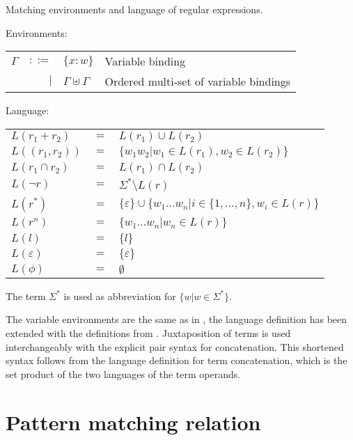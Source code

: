 \begin{defn}
   \label{defn-lang}
   Matching environments and language of regular expressions.

   Environments:

   \begin{tabular}{lrll}
      $\Gamma$	& $::=$	& $\{x:w\}$			& Variable binding	\\
		& $|$	& $\Gamma \uplus \Gamma$	& Ordered multi-set of
							  variable bindings	\\
   \end{tabular}

   Language:

   \begin{tabular}{lll}
      $L(r_1 + r_2)$	& $=$	& $L(r_1) \cup L(r_2)$					\\
      $L((r_1, r_2))$	& $=$	& $\{ w_1w_2 | w_1 \in L(r_1), w_2 \in L(r_2) \}$	\\
      $L(r_1 \cap r_2)$	& $=$	& $L(r_1) \cap L(r_2)$					\\
      $L(\neg r)$	& $=$	& $\Sigma^* \setminus L(r)$				\\
      $L(r^*)$		& $=$	&
         $\{\varepsilon\} \cup \{ w_1 \dots w_n | i
         \in \{ 1, \dots, n \}, w_i \in L(r) \}$	\\
      $L(r^n)$		& $=$	&
         $\{ w_1 \dots w_n | w_n \in L(r) \}$	\\
      $L(l)$		& $=$	& $\{l\}$						\\
      $L(\varepsilon)$	& $=$	& $\{\varepsilon\}$					\\
      $L(\phi)$		& $=$	& $\emptyset$						\\
   \end{tabular}
\end{defn}


The term $\Sigma^*$ is used as abbreviation for $\{ w | w \in \Sigma^* \}$.

The variable environments are the same as in \cite{pdpat}, the language
definition has been extended with the definitions from \cite{pdere}.
Juxtaposition of terms is used interchangeably with the explicit pair syntax
for concatenation. This shortened syntax follows from the language definition
for term concatenation, which is the set product of the two languages of the
term operands.


\section{Pattern matching relation}
\label{patmatchrel}

